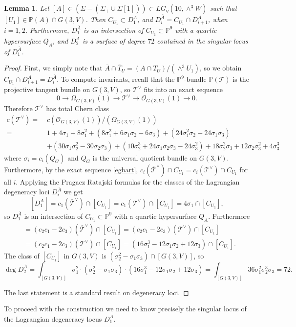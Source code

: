\documentclass[a4paper,11pt]{amsart}
\newtheorem{lem}[thm]{Lemma}
\theoremstyle{definition}
\numberwithin{equation}{section}
\numberwithin{equation}{section} \theoremstyle{definition}
\begin{document}
\begin{lem}\label{lem-ram} Let $[A]\in (\Sigma-(\Sigma_+\cup \Sigma[1])) \subset LG_\eta(10,\wedge^3W)$ such that $[U_1]\in \mathbb{P}(A)\cap G(3,V)$. Then $C_{U_1}\subset D_1^A$, and  $D_i^{\bar{A}}=C_{U_1}\cap D_{i+1}^A$, when $i=1,2$.  
Furthermore,
$D_1^{\bar{A}}$ is an intersection of $C_{U_1}\subset {{\mathbb{P}}}^9$ with a quartic hypersurface $Q_A$,
and $D_2^{\bar{A}}$ is a surface of degree $72$ contained in the singular locus of $D_1^{\bar{A}}$.
\end{lem}
\medskip
\begin{proof} 
First, we simply note that $\bar{A}\cap \bar{T}_U =(A\cap T_U)/(\wedge^3 U_1)$, so we obtain 
$C_{U_1}\cap D_{i+1}^A=D_i^{\bar{A}}$.   
To compute invariants, recall that
the ${{\mathbb{P}}}^9$-bundle ${{\mathbb{P}}}(\mathcal{T})$ is the projective tangent bundle on $G(3,V)$, 
so $\mathcal{T}^{\vee}$ fits into an exact sequence
\[
0\to\Omega_{G(3,V)}(1)\to \mathcal{T}^{\vee} \to \mathcal{O}_{G(3,V)}(1)\to 0.
\]
Therefore ${\mathcal T^{\vee} }$ has total Chern class 
\begin{align*}\label{}
c({\mathcal T^{\vee} })= \; &c(\mathcal{O}_{G(3,V)}(1))/(\Omega_{G(3,V)}(1))\\
= \; &1+4\sigma_1+8\sigma_1^2+(8\sigma_1^2+6\sigma_1\sigma_2-6\sigma_3)+(24\sigma_1^2\sigma_2-24\sigma_1\sigma_3)\\
&+(30\sigma_1\sigma_2^2-30\sigma_2\sigma_3)+(10\sigma_2^3+24\sigma_1\sigma_2\sigma_3-24\sigma_3^2)+
18\sigma_2^2\sigma_3+12\sigma_2\sigma_3^2+4\sigma_3^3 
\end{align*}
where $\sigma_i=c_i(Q_G)$ and $Q_G$ is the universal quotient bundle on $G(3,V)$.
Furthermore, by the exact sequence \ref{egbart},  $c_i(\overline {\mathcal{T}}^{\vee} )\cap C_{U_1}=c_i({\mathcal{T^{\vee} }})\cap C_{U_1}$ for all $i$.  Applying the Pragacz Ratajski formulas \cite[Theorem 2.1]{PragaczRatajski} for the classes of the Lagrangian degeneracy loci $D_i^{\bar{A}}$ we get
\[
[D^{\bar{A}}_1]=c_1(\overline{{\mathcal T}}^{\vee})\cap [C_{U_1}] =c_1(\mathcal{T}^{\vee})\cap [C_{U_1}]=4\sigma_1\cap [C_{U_1}],
\]
so  $D_1^{\bar{A}}$ is an intersection of $C_{U_1}\subset {{\mathbb{P}}}^9$ with a quartic hypersurface $Q_A$.
Furthermore
\begin{align*}
 [D^{\bar{A}}_2]&=(c_2c_1-2c_3)(\overline{{\mathcal T}}^{\vee})\cap [C_{U_1}]=(c_2c_1-2c_3)({\mathcal T}^{\vee})\cap [C_{U_1}] \\
 &=(c_2c_1-2c_3)({\mathcal T}^{\vee})\cap [C_{U_1}] = (16\sigma_1^3-12\sigma_1\sigma_2+12\sigma_3)\cap [C_{U_1}].
\end{align*}
 The class of $[C_{U_1}]$ in $G(3,V)$ is $(\sigma_2^2-\sigma_1\sigma_3)\cap [G(3,V)]$, 
 so 
 \[
 \deg D^{\bar{A}}_2=\int_{ [G(3,V)]}\sigma_1^2\cdot (\sigma_2^2-\sigma_1\sigma_3)\cdot (16\sigma_1^3-12\sigma_1\sigma_2+12\sigma_3)=\int_{ [G(3,V)]}36 \sigma_1^2\sigma_2^3\sigma_3=72.
 \]
 
 
 The last statement is a standard result on degeneracy loci.
\end{proof}
To proceed with the construction we need to know precisely the singular locus of the Lagrangian degeneracy locus $D_1^{\bar{A}}$.
 
\end{document}
